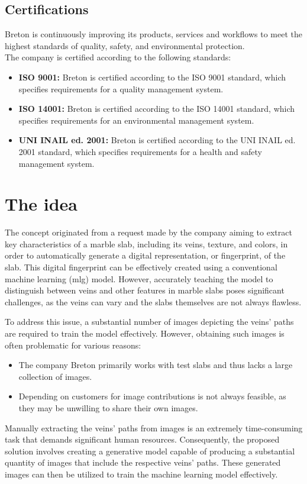 \subsection{Certifications}
Breton is continuously improving its products, services and workflows to meet the highest standards of quality, safety, and environmental protection. \\
The company is certified according to the following standards:
\begin{itemize}
    \item \textbf{ISO 9001:} Breton is certified according to the ISO 9001 standard, which specifies requirements for a quality management system.
    \item \textbf{ISO 14001:} Breton is certified according to the ISO 14001 standard, which specifies requirements for an environmental management system.
    \item \textbf{UNI INAIL ed. 2001:} Breton is certified according to the UNI INAIL ed. 2001 standard, which specifies requirements for a health and safety management system.
\end{itemize}
\section{The idea}
The concept originated from a request made by the company aiming to extract key characteristics of a marble slab, including its veins, texture, and colors, in order to automatically generate a digital representation, or fingerprint, of the slab. 
This digital fingerprint can be effectively created using a conventional machine learning (\gls{mlg}\glsfirstoccur) model. 
However, accurately teaching the model to distinguish between veins and other features in marble slabs poses significant challenges, as the veins can vary and the slabs themselves are not always flawless.

To address this issue, a substantial number of images depicting the veins' paths are required to train the model effectively. 
However, obtaining such images is often problematic for various reasons:
\begin{itemize}
    \item The company Breton primarily works with test slabs and thus lacks a large collection of images.
    \item Depending on customers for image contributions is not always feasible, as they may be unwilling to share their own images.
\end{itemize}
Manually extracting the veins' paths from images is an extremely time-consuming task that demands significant human resources. 
Consequently, the proposed solution involves creating a generative model capable of producing a substantial quantity of images that include the respective veins' paths. 
These generated images can then be utilized to train the machine learning model effectively.
